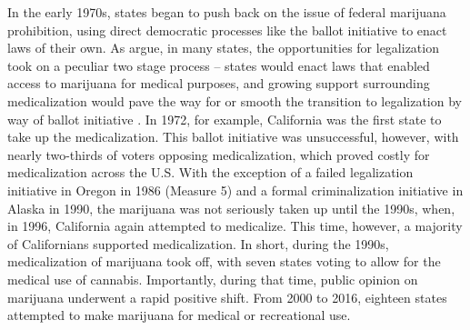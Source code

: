 In the early 1970s, states began to push back on the issue of federal marijuana prohibition, using direct democratic processes like the ballot initiative to enact laws of their own. As \citet{newhart_and_dolphin_2018} argue, in many states, the opportunities for legalization took on a peculiar two stage process -- states would enact laws that enabled access to marijuana for medical purposes, and growing support surrounding medicalization would pave the way for or smooth the transition to legalization by way of ballot initiative \citep{kilmer_and_maccoun_2017}. In 1972, for example, California was the first state to take up the medicalization. This ballot initiative was unsuccessful, however, with nearly two-thirds of voters opposing medicalization, which proved costly for medicalization across the U.S. With the exception of a failed legalization initiative in Oregon in 1986 (Measure 5) and a formal criminalization initiative in Alaska in 1990, the marijuana was not seriously taken up until the 1990s, when, in 1996, California again attempted to medicalize. This time, however, a majority of Californians supported medicalization. In short, during the 1990s, medicalization of marijuana took off, with seven states voting to allow for the medical use of cannabis. Importantly, during that time, public opinion on marijuana underwent a rapid positive shift. From 2000 to 2016, eighteen states attempted to make marijuana for medical or recreational use.




 



{\renewcommand\normalsize{\footnotesize}%

%


}




%

